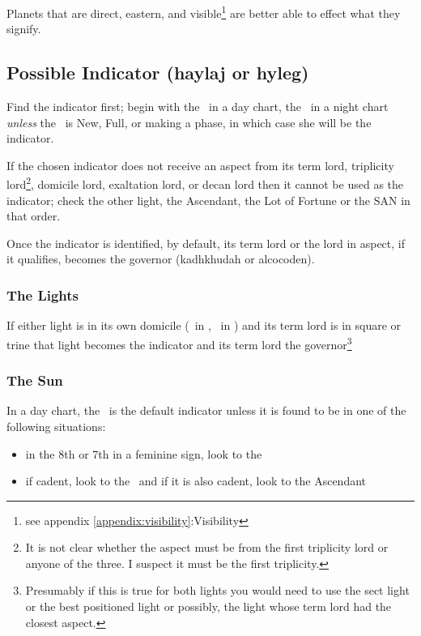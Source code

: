 Planets that are direct, eastern, and visible\footnote{see appendix \ref{appendix:visibility}:Visibility} are better able to effect what they signify.

\subsection{Possible Indicator (haylaj or hyleg)}
Find the indicator first; begin with the \Sun\, in a day chart, the \Moon\, in a night chart \textsl{unless} the \Moon\,  is New, Full, or making a phase, in which case she will be the indicator. 

If  the chosen indicator does not receive an aspect from its term lord, triplicity lord\footnote{It is not clear whether the aspect must be from the first triplicity lord or anyone of the three. I suspect it must be the first triplicity.}, domicile lord, exaltation lord, or decan lord then it cannot be used as the indicator;  check the other light, the Ascendant, the Lot of Fortune or the SAN in that order.

Once the indicator is identified, by default, its term lord or the lord in aspect, if it qualifies, becomes the governor (kadhkhudah or alcocoden).

\subsubsection{The Lights}
If either light is in its own domicile (\Sun\, in \Leo, \Moon\, in \Cancer) and its term lord is in square or trine that light becomes the indicator and its term lord the governor\footnote{Presumably if this is true for both lights you would need to use the sect light or the best positioned light or possibly, the light whose term lord had the closest aspect.}

\subsubsection{The Sun}
In a day chart, the \Sun\, is the default indicator unless it is found to be in one of the following situations:
\vspace{-0.5em}
\begin{itemize}[topsep=0em,itemsep=0em]
\item {}in the 8th or 7th in a feminine sign, look to the \Moon
\item {}if cadent, look to the \Moon\, and if it is also cadent, look to the Ascendant
\end{itemize}


